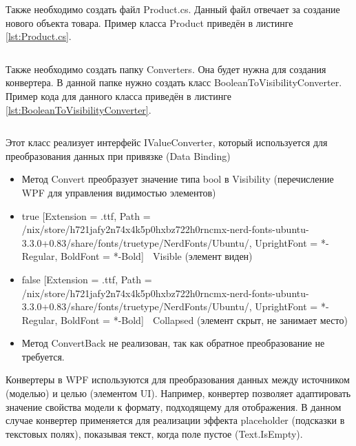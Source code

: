 \documentclass[12pt]{article}
\newcommand{\icon}[1]{\fontspec{UbuntuNerdFont}[Extension = .ttf,
  Path = /nix/store/h721jafy2n74x4k5p0hxbz722h0rncmx-nerd-fonts-ubuntu-3.3.0+0.83/share/fonts/truetype/NerdFonts/Ubuntu/,
  UprightFont = *-Regular,
BoldFont = *-Bold] #1}
\newcommand{\colorGIT}[1]{\textcolor{CtpLavender}{#1}}
\renewcommand{\texttt}[1]{{\small\ttfamily #1}}
\newenvironment{code}
  {\par\captionsetup{type=listing}\noindent}
  {\par\vspace{\baselineskip}}
\numberwithin{listing}{section}
\numberwithin{figure}{section}
\begin{document}
Также необходимо создать файл \texttt{Product.cs}. Данный файл отвечает за создание нового объекта товара. Пример класса \texttt{Product} приведён в листинге \ref{lst:Product.cs}.

\begin{code}
	\inputminted{csharp}{../3lab/StoreManager/Models/Product.cs}
	\caption{Класс \colorGIT{\href{https://github.com/WebMasterIT/Csharp_Labs/blob/ec375afd16c0647b337cf3d8a79c8bef904fc1be/3lab/StoreManager/Models/Product.cs}{Product.cs}}}
	\label{lst:Product.cs}
\end{code}

{}

Также необходимо создать папку \texttt{Converters}. Она будет нужна для создания конвертера. В данной папке нужно создать класс \texttt{BooleanToVisibilityConverter}. Пример кода для данного класса приведён в листинге \ref{lst:BooleanToVisibilityConverter}.

\begin{code}
	\inputminted{csharp}{../3lab/StoreManager/Converters/BooleanToVisibilityConverter.cs}
	\caption{Класс \colorGIT{\href{https://github.com/WebMasterIT/Csharp_Labs/blob/ec375afd16c0647b337cf3d8a79c8bef904fc1be/3lab/StoreManager/Converters/BooleanToVisibilityConverter.cs}{BooleanToVisibilityConverter}}}
	\label{lst:BooleanToVisibilityConverter}
\end{code}

Этот класс реализует интерфейс \texttt{IValueConverter}, который используется для
преобразования данных при привязке (\texttt{Data Binding})
\begin{itemize}
	\item Метод \texttt{Convert} преобразует значение типа \texttt{bool} в \texttt{Visibility} (перечисление \texttt{WPF} для управления видимостью элементов)
	\item \texttt{true} {\small{{\icon{}}}} \texttt{Visible} (элемент виден)
	\item \texttt{false} {\small{{\icon{}}}} \texttt{Collapsed} (элемент скрыт, не занимает место)
	\item Метод \texttt{ConvertBack} не реализован, так как обратное преобразование не требуется.
\end{itemize}

Конвертеры в \texttt{WPF} используются для преобразования данных между источником
(моделью) и целью (элементом \texttt{UI}). Например, конвертер позволяет адаптировать
значение свойства модели к формату, подходящему для отображения. В данном
случае конвертер применяется для реализации эффекта \texttt{placeholder} (подсказки в
текстовых полях), показывая текст, когда поле пустое (\texttt{Text.IsEmpty}).
\end{document}
